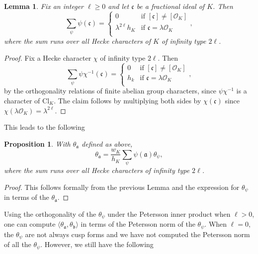 \documentclass[twoside,10pt]{article}
\newtheorem{lemma}{Lemma}
\newtheorem{prop}{Proposition}
\newcommand{\ida}{\mathfrak{a}}
\newcommand{\idb}{\mathfrak{b}}
\newcommand{\idc}{\mathfrak{c}}
\newcommand{\Clk}{\text{Cl}_K}
\renewcommand{\O}{\mathcal{O}}
\newcommand{\tpsi}{\theta_\psi}
\newcommand{\tida}{\theta_\mathfrak{a}}
\begin{document}
\begin{lemma}\label{orthorel}
	Fix an integer $\ell\geq 0$ and let $\idc$ be a fractional ideal of $K$. Then
	\[\sum_{\psi}\psi(\idc)=\begin{cases}
	0	&\text{if } [\idc]\neq[\O_K]\\
	\lambda^{2\ell}h_K &\text{if } \idc=\lambda\O_K\\
\end{cases},\]
where the sum runs over all Hecke characters of $K$ of infinity type $2\ell$.
\end{lemma}
\begin{proof}
	Fix a Hecke character $\chi$ of infinity type $2\ell$. Then
	\[\sum_{\psi}\psi\chi^{-1}(\idc)=\begin{cases}
	0	&\text{if } [\idc]\neq[\O_K]\\
	h_k &\text{if } \idc=\lambda\O_K\\
\end{cases},\]
	by the orthogonality relations of finite abelian group characters, since $\psi\chi^{-1}$ is a character of $\Clk$. The claim follows by multiplying both sides by $\chi(\idc)$ since $\chi(\lambda\O_K)=\lambda^{2\ell}$.
\end{proof}

This leads to the following
\begin{prop}\label{thetaadecomp}
	With $\tida$ defined as above,
	\[\tida=\frac{w_K}{h_K}\sum_{\psi}\psi(\ida)\tpsi,\]
	where the sum runs over all Hecke characters of infinity type $2\ell$.
\end{prop}
\begin{proof}
	This follows formally from the previous Lemma and the expression for $\tpsi$ in terms of the $\theta_\ida$.
\end{proof}

Using the orthogonality of the $\tpsi$ under the Petersson inner product when $\ell>0$, one can compute $\langle\tida,\theta_\idb\rangle$ in terms of the Petersson norm of the $\tpsi$. When $\ell=0$, the $\tpsi$ are not always cusp forms and we have not computed the Petersson norm of all the $\tpsi$. However, we still have the following
\end{document}
